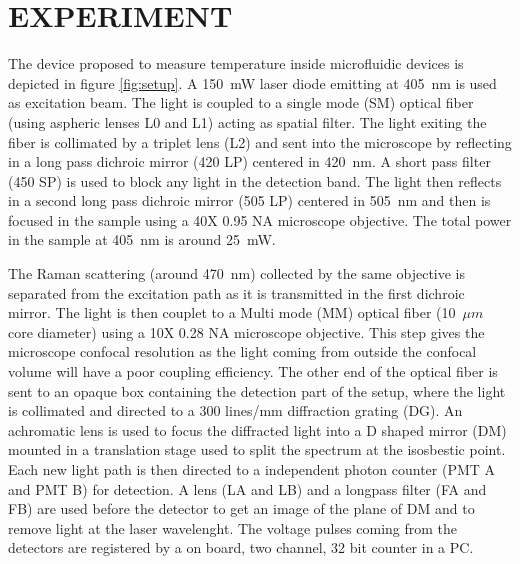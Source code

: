 \documentclass[]{spie}  %
\begin{document}
\section{EXPERIMENT}

The device proposed to measure temperature inside microfluidic devices is depicted in figure \ref{fig:setup}. A 150~mW laser diode emitting at 405~nm is used as excitation beam. The light is coupled to a single mode (SM) optical fiber (using aspheric lenses L0 and L1) acting as spatial filter. The light exiting the fiber is collimated by a triplet lens (L2) and sent into the microscope by reflecting in a long pass dichroic mirror (420 LP) centered in 420~nm. A short pass filter (450 SP) is used to block any light in the detection band. The light then reflects in a second long pass dichroic mirror (505 LP) centered in 505~nm and then is focused in the sample using a 40X 0.95 NA microscope objective. The total power in the sample at 405~nm is around 25~mW. 

The Raman scattering (around 470~nm) collected by the same objective is separated from the excitation path as it is transmitted in the first dichroic mirror. The light is then couplet to a Multi mode (MM) optical fiber (10~$\mu m$ core diameter) using a 10X 0.28 NA microscope objective. This step gives the microscope confocal resolution as the light coming from outside the confocal volume will have a poor coupling efficiency. The other end of the optical fiber is sent to an opaque box containing the detection part of the setup, where the light is collimated and directed to a 300 lines/mm diffraction grating (DG). An achromatic lens is used to focus the diffracted light into a D shaped mirror (DM) mounted in a translation stage used to split the spectrum at the isosbestic point. Each new light path is then directed to a independent photon counter (PMT A and PMT B) for detection. A lens (LA and LB) and a longpass filter (FA and FB) are used before the detector to get an image of the plane of DM and to remove light at the laser wavelenght. The voltage pulses coming from the detectors are registered by a on board, two channel, 32 bit counter in a PC.  
\end{document}
